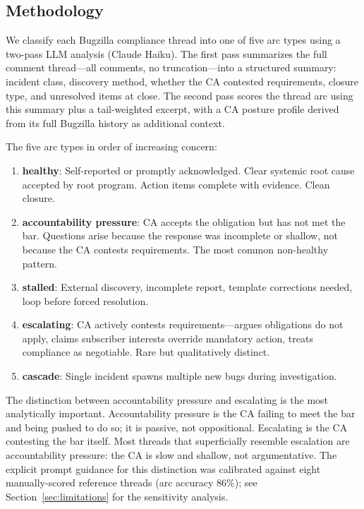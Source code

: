 \documentclass[10pt,twocolumn,letterpaper]{article}
\begin{document}
\subsection{Methodology}

We classify each Bugzilla compliance thread into one of five arc types using a two-pass
LLM analysis (Claude Haiku). The first pass summarizes the full comment thread---all
comments, no truncation---into a structured summary: incident class, discovery method,
whether the CA contested requirements, closure type, and unresolved items at close.
The second pass scores the thread arc using this summary plus a tail-weighted excerpt,
with a CA posture profile derived from its full Bugzilla history as additional context.

The five arc types in order of increasing concern:
\begin{enumerate}[noitemsep,topsep=2pt]
\item \textbf{healthy}: Self-reported or promptly acknowledged. Clear systemic root cause
  accepted by root program. Action items complete with evidence. Clean closure.
\item \textbf{accountability pressure}: CA accepts the obligation but has not met the bar.
  Questions arise because the response was incomplete or shallow, not because the CA
  contests requirements. The most common non-healthy pattern.
\item \textbf{stalled}: External discovery, incomplete report, template corrections
  needed, loop before forced resolution.
\item \textbf{escalating}: CA actively contests requirements---argues obligations do not
  apply, claims subscriber interests override mandatory action, treats compliance as
  negotiable. Rare but qualitatively distinct.
\item \textbf{cascade}: Single incident spawns multiple new bugs during investigation.
\end{enumerate}

The distinction between accountability pressure and escalating is the most analytically
important. Accountability pressure is the CA failing to meet the bar and being pushed to
do so; it is passive, not oppositional. Escalating is the CA contesting the bar itself.
Most threads that superficially resemble escalation are accountability pressure: the CA is
slow and shallow, not argumentative. The explicit prompt guidance for this distinction
was calibrated against eight manually-scored reference threads (arc accuracy 86\%);
see Section~\ref{sec:limitations} for the sensitivity analysis.
\end{document}
